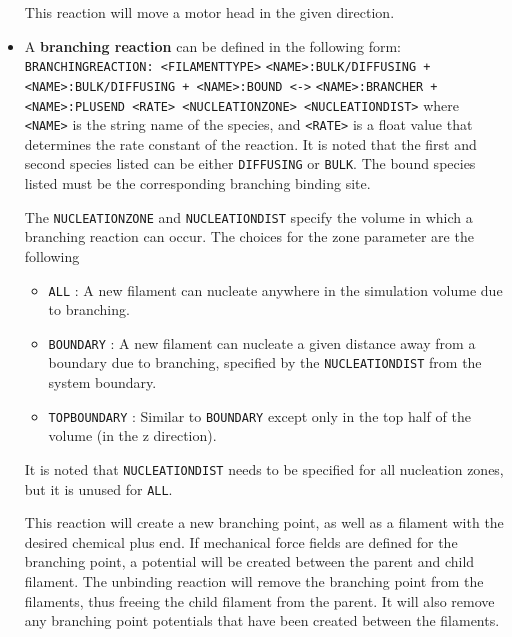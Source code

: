 \documentclass[11pt, oneside]{article}   	%
\begin{document}
\begin{itemize}
This reaction will move a motor head in the given direction.
 
\item A \textbf{branching reaction} can be defined in the following form:\newline\newline
\texttt{BRANCHINGREACTION: <FILAMENTTYPE>}\newline
\texttt{<NAME>:BULK/DIFFUSING + <NAME>:BULK/DIFFUSING +  <NAME>:BOUND <->}\newline
\texttt{<NAME>:BRANCHER + <NAME>:PLUSEND <RATE> <NUCLEATIONZONE> <NUCLEATIONDIST>}\newline\newline
where \texttt{<NAME>} is the string name of the species, and \texttt{<RATE>} is a float value that determines the rate constant of the reaction.  It is noted that the first and second species listed can be either \texttt{DIFFUSING} or \texttt{BULK}. The bound species listed must be the corresponding branching binding site.

The \texttt{NUCLEATIONZONE} and \texttt{NUCLEATIONDIST} specify the volume in which a branching reaction can occur. The choices for the zone parameter are the following

\begin{itemize}
\item \texttt{ALL} : A new filament can nucleate anywhere in the simulation volume due to branching.
\item \texttt{BOUNDARY} : A new filament can nucleate a given distance away from a boundary due to branching, specified by the \texttt{NUCLEATIONDIST} from the system boundary.

\item \texttt{TOPBOUNDARY} : Similar to \texttt{BOUNDARY} except only in the top half of the volume (in the z direction).

\end{itemize}

It is noted that \texttt{NUCLEATIONDIST} needs to be specified for all nucleation zones, but it is unused for \texttt{ALL}.

This reaction will create a new branching point, as well as a filament with the desired chemical plus end. If mechanical force fields are defined for the branching point, a potential will be created between the parent and child filament. The unbinding reaction will remove the branching point from the filaments, thus freeing the child filament from the parent. It will also remove any branching point potentials that have been created between the filaments.
 

\end{itemize}
\end{document}

